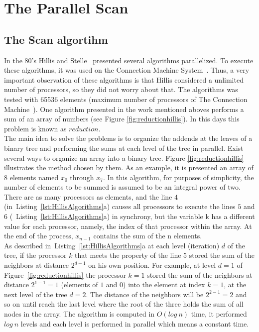 \documentclass[Ingles]{ic-tese-v1}
\newcommand{\rfig}[1]{Figure~\ref{fig:#1}}
\newcommand{\rlsts}[2]{Listing~\ref{lst:#1}{#2}}
\begin{document}
\chapter{The Parallel Scan}
\label{cap:Scan}

\section{The Scan algortihm}
\label{sec:ScanAlg}

In the 80's Hillis and Stelle~\cite{dataparallel} presented several algorithms
parallelized. To execute these algorithms, it was used on the Connection Machine System~\cite{themachine}. Thus, a very important observation of these algorithms
is that Hillis considered a unlimited number of processors, so they did not worry about that. The algorithms was tested with 65536 elements (maximum number of processors of The Connection Machine~\cite{themachine}).
One algorithm presented in the work mentioned aboves performs a sum of an array of numbers (see Figure \ref{fig:reductionhillis}). In this days this problem is known as $reduction$.\\
The main idea to solve the problems is to organize the addends at the leaves of a
binary tree and performing the sums at each level of the tree in parallel. Exist several ways to organize an array into a binary tree. Figure \ref{fig:reductionhillis} illustrates the method chosen by them. As an example, it is presented an array of 8 elements named $x_{0}$ through $x_{7}$. In this algorithm, for purposes of simplicity, the number of elements to be summed is assumed to be an integral power of two. There are as many processors as elements, and the line $4$ (in~\rlsts{HillisAlgorithms}{a}) causes all processors to execute the lines $5$ and $6$ (~\rlsts{HillisAlgorithms}{a}) in synchrony, but the variable k has a different value for each processor, namely, the index of that processor within the array. At the end of the process, $x_{n-1}$ contains the sum of the n elements.\\
As described in~\rlsts{HillisAlgorithms}{a} at each level
(iteration) $d$ of the tree, if the processor $k$ that meets the property of the line $5$
stored the sum of the neighbors at distance $2^{d-1}$ on his own position.
For  example, at  level $d  = 1$  of \rfig{reductionhillis} the processor $k = 1$ stored the sum of the neighbors at distance $2^{1-1} = 1$ (elements of $1$ and $0$) into the element at index $k = 1$, at the  next level of  the tree $d = 2$. The distance of the
neighbors will be $2^{2-1} = 2$ and so on until reach the last level where the root of the three holds the sum of all nodes in the array. The algorithm is computed in $O(log\ n)$ time, it performed $log\ n$ levels and each level is performed in parallel which means a constant time.
\end{document}
